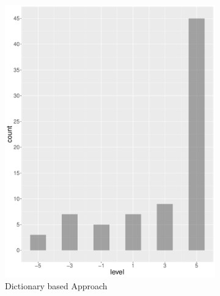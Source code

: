 \begin{figure}
\begin{subfigure}[b]{0.4\textwidth}
        \includegraphics[width=\textwidth]{plots/finance/hist_level_es}
        \caption{Dictionary based Approach}
        \label{fig:hist_level_finance_es}
    \end{subfigure}
    ~
    \begin{subfigure}[b]{0.4\textwidth}

\end{subfigure}
\end{figure}
